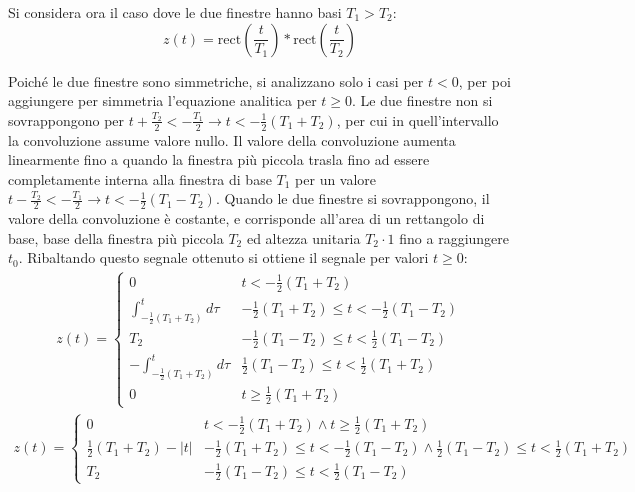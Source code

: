 \documentclass{article}
\begin{document}
Si considera ora il caso dove le due finestre hanno basi $T_1>T_2$:
\begin{equation*}
    z(t)=\mbox{rect}\left(\displaystyle\frac{t}{T_1}\right)*\mbox{rect}\left(\frac{t}{T_2}\right)
\end{equation*}

Poiché le due finestre sono simmetriche, si analizzano solo i casi per $t<0$, per poi aggiungere per simmetria l'equazione analitica per $t\geq0$. Le due finestre non si 
sovrappongono per $t+\displaystyle\frac{T_2}{2}<-\frac{T_1}{2}\to t<-\frac{1}{2}(T_1+T_2)$, per cui in quell'intervallo la convoluzione assume valore nullo. Il valore 
della convoluzione aumenta linearmente fino a quando la finestra più piccola trasla fino ad essere completamente interna alla finestra di base $T_1$ per un valore 
$t-\displaystyle\frac{T_2}{2}<-\frac{T_1}{2}\to t<-\frac{1}{2}(T_1-T_2)$. Quando le due finestre si sovrappongono, il valore della convoluzione è costante, e corrisponde 
all'area di un rettangolo di base, base della finestra più piccola $T_2$ ed altezza unitaria $T_2\cdot1$ fino a raggiungere $t_0$. Ribaltando questo segnale ottenuto 
si ottiene il segnale per valori $t\geq0$:
\begin{gather*}
    z(t)=\begin{cases}
        0&t<-\displaystyle\frac{1}{2}(T_1+T_2)\\
        \displaystyle\int_{-\frac{1}{2}(T_1+T_2)}^td\tau&-\frac{1}{2}(T_1+T_2)\leq t <-\frac{1}{2}(T_1-T_2)\\
        T_2&-\frac{1}{2}(T_1-T_2)\leq t<\frac{1}{2}(T_1-T_2)\\
        -\displaystyle\int_{-\frac{1}{2}(T_1+T_2)}^td\tau&\frac{1}{2}(T_1-T_2)\leq t <\frac{1}{2}(T_1+T_2)\\
        0&t\geq\displaystyle\frac{1}{2}(T_1+T_2)
    \end{cases}
\end{gather*}
\begin{gather}
    z(t)=\begin{cases}
        0&t<-\displaystyle\frac{1}{2}(T_1+T_2)\land t\geq\frac{1}{2}(T_1+T_2)\\
        \displaystyle\frac{1}{2}(T_1+T_2)-|t| &-\frac{1}{2}(T_1+T_2)\leq t <-\frac{1}{2}(T_1-T_2)\land \frac{1}{2}(T_1-T_2)\leq t <\frac{1}{2}(T_1+T_2)\\
        T_2&-\displaystyle\frac{1}{2}(T_1-T_2)\leq t<\frac{1}{2}(T_1-T_2)
    \end{cases}
\end{gather}
\end{document}
